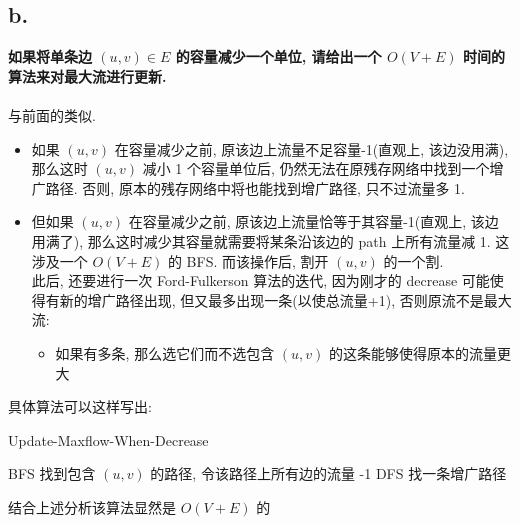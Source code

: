 \documentclass[UTF8]{article}
\newcommand{\jumpLine} {\hspace*{\fill} \\}
\begin{document}
\subsection*{b.}
\noindent \textbf{如果将单条边 $(u,v)\in E$ 的容量减少一个单位, 请给出一个 $O(V+E)$ 时间的算法来对最大流进行更新.}\\
\jumpLine
与前面的类似.
\begin{itemize}
\item 如果 $(u,v)$ 在容量减少之前, 原该边上流量不足容量-1(直观上, 该边没用满), 那么这时 $(u,v)$ 减小 1 个容量单位后, 仍然无法在原残存网络中找到一个增广路径. 否则, 原本的残存网络中将也能找到增广路径, 只不过流量多 1.
\item 但如果 $(u,v)$ 在容量减少之前, 原该边上流量恰等于其容量-1(直观上, 该边用满了), 那么这时减少其容量就需要将某条沿该边的 path 上所有流量减 1. 这涉及一个 $O(V+E)$ 的 BFS. 而该操作后, 割开 $(u,v)$ 的一个割.\\
此后, 还要进行一次 Ford-Fulkerson 算法的迭代, 因为刚才的 decrease 可能使得有新的增广路径出现, 但又最多出现一条(以使总流量+1), 否则原流不是最大流:
	\begin{itemize}
	\item 如果有多条, 那么选它们而不选包含 $(u,v)$ 的这条能够使得原本的流量更大
	\end{itemize}
\end{itemize}
具体算法可以这样写出:
\begin{algorithm}[H]
	\caption{{\sc Update-Maxflow-When-Decrease}}
	\begin{algorithmic}[1] %
	\State BFS 找到包含 $(u,v)$ 的路径, 令该路径上所有边的流量 -1
	\State DFS 找一条增广路径
	 
	\Else {}
	\EndIf
	\end{algorithmic}
\end{algorithm}
结合上述分析该算法显然是 $O(V+E)$ 的
\end{document}
